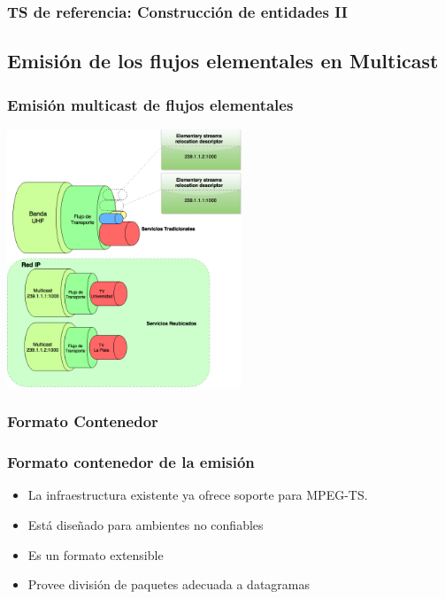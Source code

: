 \documentclass[a4paper,11pt]{beamer}
\begin{document}
		\begin{frame}
			\frametitle{TS de referencia: Construcción de entidades II}
			\resizebox{\textwidth}{!}{
				
			}
		\end{frame}


	\subsection{Emisión de los flujos elementales en Multicast}
		\begin{frame}
			\frametitle{Emisión multicast de flujos elementales}
			\begin{center}
				\includegraphics[width=7cm]{cable_flujo_c23e_ts.png}
			\end{center}
		\end{frame}
		
		\subsubsection{Formato Contenedor}
		\begin{frame}
			\frametitle{Formato contenedor de la emisión}
			\begin{itemize}
				\item La infraestructura existente ya ofrece soporte para MPEG-TS.
				\item Está diseñado para ambientes no confiables
				\item Es un formato extensible
				\item Provee división de paquetes adecuada a datagramas
			\end{itemize}
		\end{frame}
		
\end{document}

